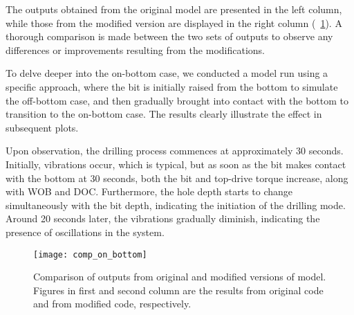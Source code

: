 The outputs obtained from the original model are presented in the left column, while those from the modified version are displayed in the right column (\figurename~\ref{Comaprison_on_bottom}). A thorough comparison is made between the two sets of outputs to observe any differences or improvements resulting from the modifications. 

To delve deeper into the on-bottom case, we conducted a model run using a specific approach, where the bit is initially raised from the bottom to simulate the off-bottom case, and then gradually brought into contact with the bottom to transition to the on-bottom case. The results clearly illustrate the effect in subsequent plots.

Upon observation, the drilling process commences at approximately 30 seconds. Initially, vibrations occur, which is typical, but as soon as the bit makes contact with the bottom at 30 seconds, both the bit and top-drive torque increase, along with WOB and DOC. Furthermore, the hole depth starts to change simultaneously with the bit depth, indicating the initiation of the drilling mode. Around 20 seconds later, the vibrations gradually diminish, indicating the presence of oscillations in the system.

\begin{figure}
  \centering
  \texttt{[image: comp\_on\_bottom]}
  \caption[Output comparison or original and modified model]{Comparison of outputs from original and modified versions of model. Figures in first and second column are the results from original code and from modified code, respectively.}\label{Comaprison_on_bottom}
\end{figure}